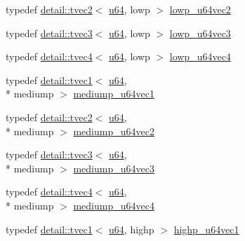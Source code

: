 \begin{DoxyCompactItemize}
typedef \hyperlink{structglm_1_1detail_1_1tvec2}{detail\-::tvec2}$<$ \hyperlink{group__gtc__type__precision_ga71cedd4972f9cb1a5e14dfe5ab83ecd7}{u64}, lowp $>$ \hyperlink{group__gtc__type__precision_gae0e7d3ed32e8e79b4f6dd0c9baafcaea}{lowp\-\_\-u64vec2}
\item 
typedef \hyperlink{structglm_1_1detail_1_1tvec3}{detail\-::tvec3}$<$ \hyperlink{group__gtc__type__precision_ga71cedd4972f9cb1a5e14dfe5ab83ecd7}{u64}, lowp $>$ \hyperlink{group__gtc__type__precision_gaa62794e3f055a333a85c0e52376f2429}{lowp\-\_\-u64vec3}
\item 
typedef \hyperlink{structglm_1_1detail_1_1tvec4}{detail\-::tvec4}$<$ \hyperlink{group__gtc__type__precision_ga71cedd4972f9cb1a5e14dfe5ab83ecd7}{u64}, lowp $>$ \hyperlink{group__gtc__type__precision_ga1dc6d791a39dc52ee296a891d5b9b084}{lowp\-\_\-u64vec4}
\item 
typedef \hyperlink{structglm_1_1detail_1_1tvec1}{detail\-::tvec1}$<$ \hyperlink{group__gtc__type__precision_ga71cedd4972f9cb1a5e14dfe5ab83ecd7}{u64}, \\*
mediump $>$ \hyperlink{group__gtc__type__precision_gaf4211dc9e211d57b34b45a612b6de193}{mediump\-\_\-u64vec1}
\item 
typedef \hyperlink{structglm_1_1detail_1_1tvec2}{detail\-::tvec2}$<$ \hyperlink{group__gtc__type__precision_ga71cedd4972f9cb1a5e14dfe5ab83ecd7}{u64}, \\*
mediump $>$ \hyperlink{group__gtc__type__precision_ga9eda8d6f5be7a2919fb90412535b385f}{mediump\-\_\-u64vec2}
\item 
typedef \hyperlink{structglm_1_1detail_1_1tvec3}{detail\-::tvec3}$<$ \hyperlink{group__gtc__type__precision_ga71cedd4972f9cb1a5e14dfe5ab83ecd7}{u64}, \\*
mediump $>$ \hyperlink{group__gtc__type__precision_ga7af0601e6a8ce71bd21ecf67971f5154}{mediump\-\_\-u64vec3}
\item 
typedef \hyperlink{structglm_1_1detail_1_1tvec4}{detail\-::tvec4}$<$ \hyperlink{group__gtc__type__precision_ga71cedd4972f9cb1a5e14dfe5ab83ecd7}{u64}, \\*
mediump $>$ \hyperlink{group__gtc__type__precision_gae25a6609fa377ba1ec983ec32a91f1d4}{mediump\-\_\-u64vec4}
\item 
typedef \hyperlink{structglm_1_1detail_1_1tvec1}{detail\-::tvec1}$<$ \hyperlink{group__gtc__type__precision_ga71cedd4972f9cb1a5e14dfe5ab83ecd7}{u64}, highp $>$ \hyperlink{group__gtc__type__precision_gab48ca217e1d1cc9aac3d9f037493ae7e}{highp\-\_\-u64vec1}
\item 

\end{DoxyCompactItemize}
